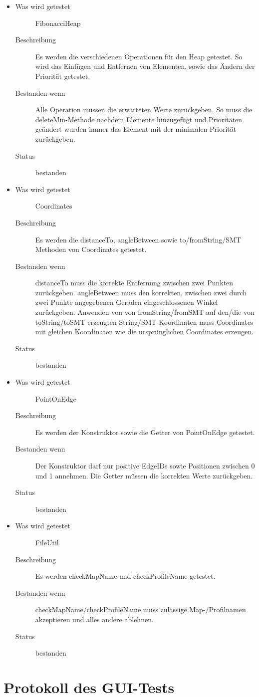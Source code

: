 \documentclass[a4paper, 11pt]{article}
\newcommand{\test}[4]{%
  \item
    \begin{description}
    \item[Was wird getestet] #1
    \item[Beschreibung] #2
    \item[Bestanden wenn] #3
    \item[Status] #4
    \end{description}
}
\begin{document}
\begin{itemize}
\test{
FibonacciHeap
}{
Es werden die verschiedenen Operationen für den Heap getestet.
So wird das Einfügen und Entfernen von Elementen, sowie das Ändern der Priorität getestet.
}{
Alle Operation müssen die erwarteten Werte zurückgeben. So muss die deleteMin-Methode nachdem Elemente hinzugefügt und Prioritäten geändert wurden immer das Element mit der minimalen Priorität zurückgeben.
}{
bestanden
}
\test{Coordinates}{Es werden die distanceTo, angleBetween sowie to/fromString/SMT Methoden von Coordinates getestet.}{distanceTo muss die korrekte Entfernung zwischen zwei Punkten zurückgeben. angleBetween muss den korrekten, zwischen zwei durch zwei Punkte angegebenen Geraden eingeschlossenen Winkel zurückgeben. Anwenden von von fromString/fromSMT auf den/die von toString/toSMT erzeugten String/SMT-Koordinaten muss Coordinates mit gleichen Koordinaten wie die ursprünglichen Coordinates erzeugen.}{bestanden}
\test{PointOnEdge}{Es werden der Konstruktor sowie die Getter von PointOnEdge getestet.}{Der Konstruktor darf nur positive EdgeIDs sowie Positionen zwischen 0 und 1 annehmen. Die Getter müssen die korrekten Werte zurückgeben.}{bestanden}
\test{FileUtil}{Es werden checkMapName und checkProfileName getestet.}{checkMapName/checkProfileName muss zulässige Map-/Profilnamen akzeptieren und alles andere ablehnen.}{bestanden}
\end{itemize}

\section{Protokoll des GUI-Tests}
\end{document}
